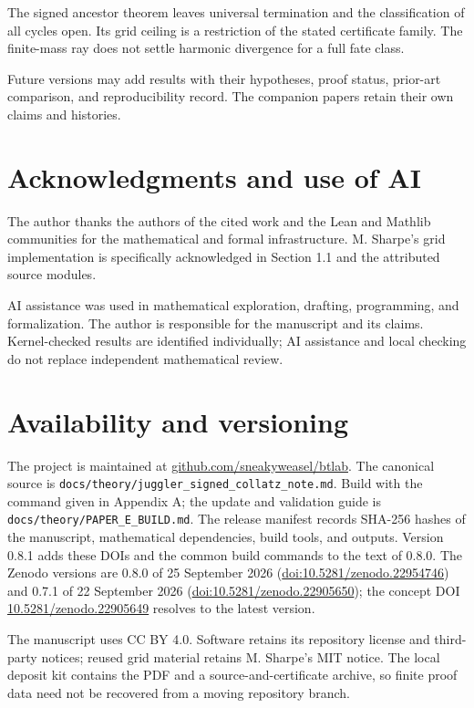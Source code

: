 \documentclass[11pt,a4paper]{article}
\begin{document}
The signed ancestor theorem leaves universal termination and the
classification of all cycles open. Its grid ceiling is a restriction of
the stated certificate family. The finite-mass ray does not settle
harmonic divergence for a full fate class.

Future versions may add results with their hypotheses, proof status,
prior-art comparison, and reproducibility record. The companion papers
retain their own claims and histories.

\section{Acknowledgments and use of
AI}\label{acknowledgments-and-use-of-ai}

The author thanks the authors of the cited work and the Lean and Mathlib
communities for the mathematical and formal infrastructure. M. Sharpe's
grid implementation is specifically acknowledged in Section 1.1 and the
attributed source modules.

AI assistance was used in mathematical exploration, drafting,
programming, and formalization. The author is responsible for the
manuscript and its claims. Kernel-checked results are identified
individually; AI assistance and local checking do not replace
independent mathematical review.

\section{Availability and versioning}\label{availability-and-versioning}

The project is maintained at
\href{https://github.com/sneakyweasel/btlab}{github.com/sneakyweasel/btlab}.
The canonical source is
\texttt{\nolinkurl{docs/theory/juggler_signed_collatz_note.md}}. Build
with the command given in Appendix A; the update and validation guide is
\texttt{\nolinkurl{docs/theory/PAPER_E_BUILD.md}}. The release manifest
records SHA-256 hashes of the manuscript, mathematical dependencies,
build tools, and outputs. Version 0.8.1 adds these DOIs and the common
build commands to the text of 0.8.0. The Zenodo versions are 0.8.0 of 25
September 2026
(\href{https://doi.org/10.5281/zenodo.22954746}{doi:10.5281/zenodo.22954746})
and 0.7.1 of 22 September 2026
(\href{https://doi.org/10.5281/zenodo.22905650}{doi:10.5281/zenodo.22905650});
the concept DOI
\href{https://doi.org/10.5281/zenodo.22905649}{10.5281/zenodo.22905649}
resolves to the latest version.

The manuscript uses CC BY 4.0. Software retains its repository license
and third-party notices; reused grid material retains M. Sharpe's MIT
notice. The local deposit kit contains the PDF and a
source-and-certificate archive, so finite proof data need not be
recovered from a moving repository branch.
\end{document}
